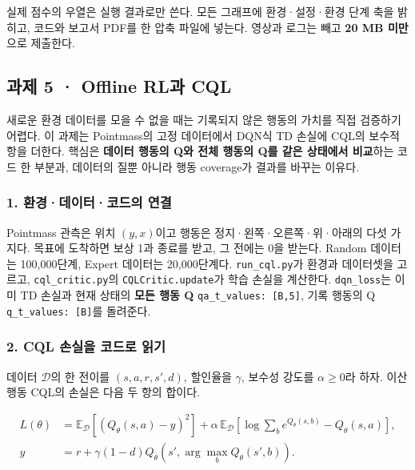 \documentclass[11pt,a4paper]{article}
\begin{document}
실제 점수의 우열은 실행 결과로만 쓴다. 모든 그래프에 환경·설정·환경 단계 축을 밝히고, 코드와 보고서 PDF를 한 압축 파일에 넣는다. 영상과 로그는 빼고 \textbf{20 MB 미만}으로 제출한다.\par

\clearpage
\subsection{과제 5 · Offline RL과 CQL}


새로운 환경 데이터를 모을 수 없을 때는 기록되지 않은 행동의 가치를 직접 검증하기 어렵다. 이 과제는 Pointmass의 고정 데이터에서 DQN식 TD 손실에 CQL의 보수적 항을 더한다. 핵심은 \textbf{데이터 행동의 Q와 전체 행동의 Q를 같은 상태에서 비교}하는 코드 한 부분과, 데이터의 질뿐 아니라 행동 coverage가 결과를 바꾸는 이유다.\par

\subsubsection{1. 환경·데이터·코드의 연결}

Pointmass 관측은 위치 $(y,x)$이고 행동은 정지·왼쪽·오른쪽·위·아래의 다섯 가지다. 목표에 도착하면 보상 1과 종료를 받고, 그 전에는 0을 받는다. Random 데이터는 100,000단계, Expert 데이터는 20,000단계다. \texttt{run\_\allowbreak{}cql.\allowbreak{}py}가 환경과 데이터셋을 고르고, \texttt{cql\_\allowbreak{}critic.\allowbreak{}py}의 \texttt{CQLCritic.\allowbreak{}update}가 학습 손실을 계산한다. \texttt{dqn\_\allowbreak{}loss}는 이미 TD 손실과 현재 상태의 \textbf{모든 행동 Q} \texttt{qa\_\allowbreak{}t\_\allowbreak{}values: [B,\allowbreak{}5]}, 기록 행동의 Q \texttt{q\_\allowbreak{}t\_\allowbreak{}values: [B]}를 돌려준다.\par

\subsubsection{2. CQL 손실을 코드로 읽기}

데이터 $\mathcal D$의 한 전이를 $(s,a,r,s',d)$, 할인율을 $\gamma$, 보수성 강도를 $\alpha\ge0$라 하자. 이산 행동 CQL의 손실은 다음 두 항의 합이다.\par

\[
\begin{aligned}
L(\theta)&=\mathbb E_{\mathcal D}\left[(Q_\theta(s,a)-y)^2\right]
+\alpha\,\mathbb E_{\mathcal D}\left[\log\sum_b e^{Q_\theta(s,b)}-Q_\theta(s,a)\right],\\
y&=r+\gamma(1-d)Q_{\bar\theta}(s',\arg\max_bQ_\theta(s',b)).
\end{aligned}
\]
\end{document}
